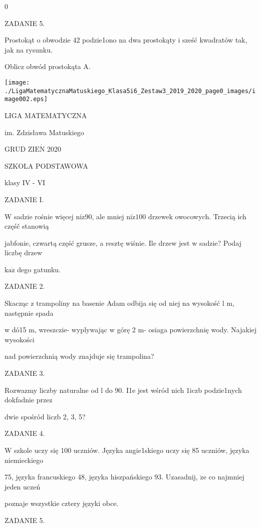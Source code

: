 \documentclass[a4paper,12pt]{article}
\begin{document}
0

ZADANIE 5.

Prostokąt o obwodzie 42 podzie1ono na dwa prostokąty i sześć kwadratów tak, jak na rysunku.

Oblicz obwód prostokąta A.
\begin{center}
\texttt{[image: ./LigaMatematycznaMatuskiego\_Klasa5i6\_Zestaw3\_2019\_2020\_page0\_images/image002.eps]}
\end{center}





LIGA MATEMATYCZNA

im. Zdzisława Matuskiego

GRUD Z$\mathrm{I}\mathrm{E}\acute{\mathrm{N}}$ 2020

SZKOLA PODSTAWOWA

klasy IV - VI

ZADANIE I.

$\mathrm{W}$ sadzie rośnie więcej $\mathrm{n}\mathrm{i}\dot{\mathrm{z}}90$, ale mniej $\mathrm{n}\mathrm{i}\dot{\mathrm{z}}100$ drzewek owocowych. Trzecią ich częśč stanowią

jabfonie, czwartą część grusze, a resztę wiśnie. Ile drzew jest w sadzie? Podaj liczbę drzew

$\mathrm{k}\mathrm{a}\dot{\mathrm{z}}$ dego gatunku.

ZADANIE 2.

Skacząc z trampoliny na basenie Adam odbija się od niej na wysokość l $\mathrm{m}$, następnie spada

w dó15 $\mathrm{m}$, wreszczie- wyplywając w górę 2 m- osiaga powierzchnię wody. Najakiej wysokości

nad powierzchnią wody znajduje się trampolina?

ZADANIE 3.

Rozwazmy liczby naturalne od l do 90. I1e jest wśród nich 1iczb podzie1nych dokfadnie przez

dwie spośród liczb 2, 3, 5?

ZADANIE 4.

$\mathrm{W}$ szkole uczy się 100 uczniów. Języka angie1skiego uczy się 85 uczniów, języka niemieckiego

75, języka francuskiego 48, języka hiszpańskiego 93. Uzasadnij, $\dot{\mathrm{z}}\mathrm{e}$ co najmniej jeden uczeń

poznaje wszystkie cztery języki obce.

ZADANIE 5.
\end{document}
